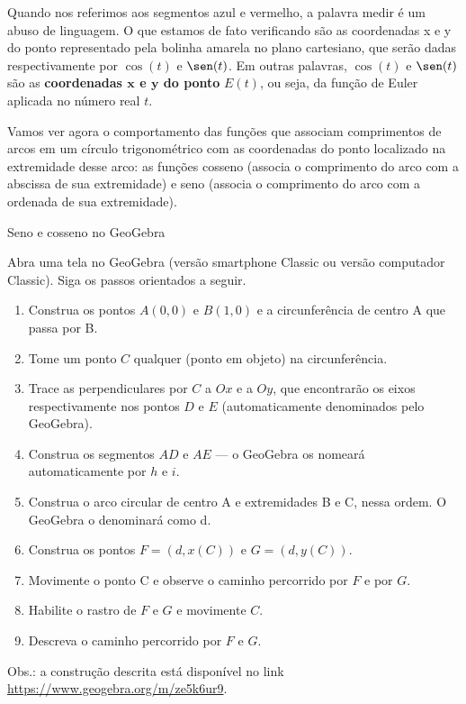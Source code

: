 Quando nos referimos aos segmentos azul e vermelho, a palavra medir é um abuso de linguagem. O que estamos de fato verificando são as coordenadas x e y do ponto representado pela bolinha amarela no plano cartesiano, que serão dadas respectivamente por $\cos(t)$ e $\sen(t)$.  Em outras palavras, $\cos(t)$ e $\sen(t)$ são as \textbf{coordenadas $\bm{x}$ e $\bm{y}$ do ponto} $E(t)$, ou seja, da função de Euler aplicada no número real $t$.

Vamos ver agora o comportamento das funções que associam comprimentos de arcos em um círculo trigonométrico com as coordenadas do ponto localizado na extremidade desse arco: as funções cosseno (associa o comprimento do arco com a abscissa de sua extremidade) e seno (associa o comprimento do arco com a ordenada de sua extremidade).

\label{trig-exp5}

\begin{task}{Seno e cosseno no GeoGebra}
\label{trig-ativ17}

Abra uma tela no GeoGebra (versão smartphone Classic ou versão computador Classic). Siga os passos orientados a seguir.
\begin{enumerate}
\item Construa os pontos $A(0,0)$ e $B(1,0)$ e a circunferência de centro A que passa por B.
\item Tome um ponto $C$ qualquer (ponto em objeto) na circunferência.
\item Trace as perpendiculares por $C$ a $Ox$ e a $Oy$, que encontrarão os eixos respectivamente nos pontos $D$ e $E$ (automaticamente denominados pelo GeoGebra).
\item Construa os segmentos $AD$ e $AE$ --– o GeoGebra os nomeará automaticamente por $h$ e $i$.
\item Construa o arco circular de centro A e extremidades B e C, nessa ordem. O GeoGebra o denominará como d.
\item Construa os pontos $F=(d,x(C))$ e $G=(d,y(C))$.
\item Movimente o ponto C e observe o caminho percorrido por $F$ e por $G$.
\item Habilite o rastro de $F$ e $G$ e movimente $C$.
\item Descreva o caminho percorrido por $F$ e $G$.
\end{enumerate}

Obs.: a construção descrita está disponível no link \url{https://www.geogebra.org/m/ze5k6ur9}.
\end{task}

